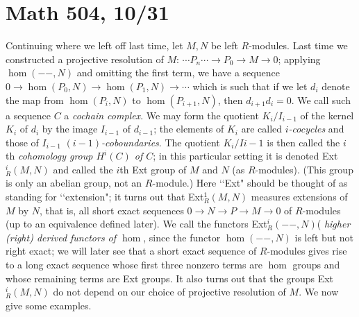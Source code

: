\documentclass[10pt]{article}
\begin{document}
\section*{Math 504, 10/31}

Continuing where we left off last time, let $M,N$ be left $R$-modules.
Last time we constructed a projective resolution of $M$: $\cdots
P_n\cdots\rightarrow P_0 \rightarrow M\rightarrow 0$; applying
$\hom(--,N)$ and omitting the first term, we have a sequence
$0\rightarrow\hom(P_0,N)\rightarrow\hom(P_1,N)\rightarrow\cdots$ which
is such that if we let $d_i$ denote the map from $\hom(P_i,N)$ to
$\hom(P_{i+1},N)$, then $d_{i+1} d_i = 0$. We call such a sequence $C$ a
{\sl cochain complex}. We may form the quotient $K_i/I_{i-1}$ of the
kernel $K_i$ of $d_i$ by the image $I_{i-1}$ of $d_{i-1}$; the elements
of $K_i$ are called {\sl $i$-cocycles} and those of $I_{i-1}$ {\sl
  $(i-1)$-coboundaries}. The quotient $K_i/I{i-1}$ is then called the
$i$th {\sl cohomology group $H^i(C)$ of $C$}; in this particular setting
it is denoted Ext$_R^i(M,N)$ and called the $i$th Ext group of $M$ and
$N$ (as $R$-modules). (This group is only an abelian group, not an
$R$-module.) Here \lq\lq Ext" should be thought of as standing for
\lq\lq extension"; it turns out that Ext$_R^1(M,N)$ measures extensions
of $M$ by $N$, that is, all short exact sequences $0\rightarrow
N\rightarrow P\rightarrow M\rightarrow 0$ of $R$-modules (up to an
equivalence defined later). We call the functors Ext$_R^i(--,N)$( {\sl
  higher (right) derived functors of $\hom$}, since the functor
$\hom(--,N)$ is left but not right exact; we will later see that a short
exact sequence of $R$-modules gives rise to a long exact sequence whose
first three nonzero terms are $\hom$ groups and whose remaining terms
are Ext groups. It also turns out that the groups Ext$_R^i(M,N)$ do not
depend on our choice of projective resolution of $M$. We now give some
examples.
\end{document}
